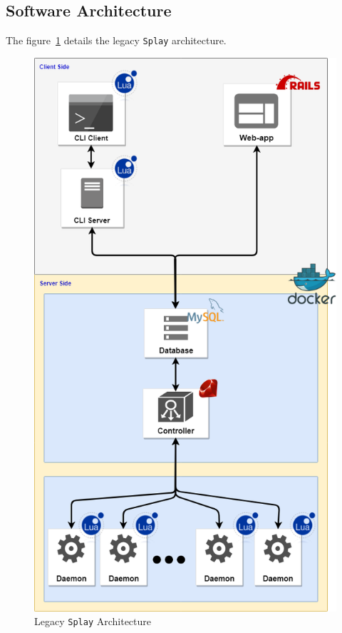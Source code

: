 \documentclass{eplmastersthesis}
\begin{document}
      \subsection{Software Architecture}

        The figure~\ref{prev_arch} details the legacy \texttt{Splay}
        architecture.

        \begin{figure}[H]
          \centering
          \includegraphics[scale=0.4]{figures/prev_arch.png}
          \caption{\label{prev_arch} Legacy \texttt{Splay} Architecture}
        \end{figure}
\end{document}
